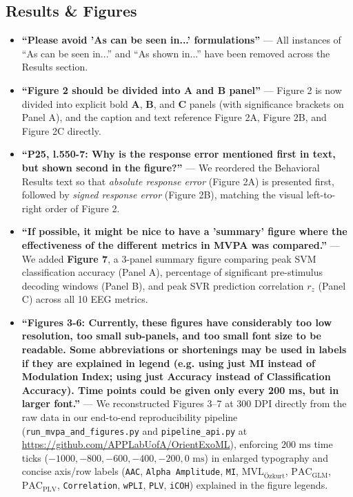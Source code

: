 \documentclass[11pt]{article}
\begin{document}
\subsection*{Results \& Figures}
\begin{itemize}[leftmargin=1.5em]
    \item \textbf{``Please avoid 'As can be seen in...' formulations''} --- \textcolor{revblue}{All instances of ``As can be seen in...'' and ``As shown in...'' have been removed across the Results section.}
    \item \textbf{``Figure 2 should be divided into A and B panel''} --- \textcolor{revblue}{Figure 2 is now divided into explicit bold \textbf{A}, \textbf{B}, and \textbf{C} panels (with significance brackets on Panel A), and the caption and text reference Figure 2A, Figure 2B, and Figure 2C directly.}
    \item \textbf{``P25, l.550-7: Why is the response error mentioned first in text, but shown second in the figure?''} --- \textcolor{revblue}{We reordered the Behavioral Results text so that \textit{absolute response error} (Figure 2A) is presented first, followed by \textit{signed response error} (Figure 2B), matching the visual left-to-right order of Figure 2.}
    \item \textbf{``If possible, it might be nice to have a 'summary' figure where the effectiveness of the different metrics in MVPA was compared.''} --- \textcolor{revblue}{We added \textbf{Figure 7}, a 3-panel summary figure comparing peak SVM classification accuracy (Panel A), percentage of significant pre-stimulus decoding windows (Panel B), and peak SVR prediction correlation $r_z$ (Panel C) across all 10 EEG metrics.}
    \item \textbf{``Figures 3-6: Currently, these figures have considerably too low resolution, too small sub-panels, and too small font size to be readable. Some abbreviations or shortenings may be used in labels if they are explained in legend (e.g. using just MI instead of Modulation Index; using just Accuracy instead of Classification Accuracy). Time points could be given only every 200 ms, but in larger font.''} --- \textcolor{revblue}{We reconstructed Figures 3--7 at 300 DPI directly from the raw data in our end-to-end reproducibility pipeline (\texttt{run\_mvpa\_and\_figures.py} and \texttt{pipeline\_api.py} at \url{https://github.com/APPLabUofA/OrientExoML}), enforcing $200\text{ ms}$ time ticks ($-1000, -800, -600, -400, -200, 0\text{ ms}$) in enlarged typography and concise axis/row labels (\texttt{AAC}, \texttt{Alpha Amplitude}, \texttt{MI}, $\text{MVL}_{\text{\"Ozkurt}}$, $\text{PAC}_{\text{GLM}}$, $\text{PAC}_{\text{PLV}}$, \texttt{Correlation}, \texttt{wPLI}, \texttt{PLV}, \texttt{iCOH}) explained in the figure legends.}
\end{itemize}
\end{document}
